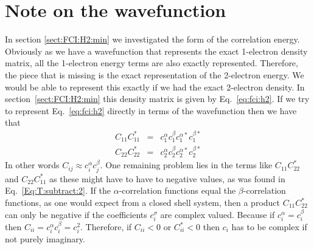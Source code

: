 \documentclass[pra,nofootinbib]{revtex4-1}
\begin{document}
\section{Note on the wavefunction}

In section \ref{sect:FCI:H2:min} we investigated the form of the correlation energy.
Obviously as we have a wavefunction that represents the exact 1-electron density
matrix, all the 1-electron energy terms are also exactly represented. Therefore, the
piece that is missing is the exact representation of the 2-electron energy. We would
be able to represent this exactly if we had the exact 2-electron density. In
section~\ref{sect:FCI:H2:min} this density matrix is given by Eq.~\ref{eq:fci:h2}.
If we try to represent Eq.~\ref{eq:fci:h2} directly in terms of the wavefunction then we
have that
\begin{eqnarray}
C_{11}C_{11}^* &=& c_1^\alpha c_1^\beta c_1^{\alpha*}c_1^{\beta*} \\
C_{22}C_{22}^* &=& c_2^\alpha c_2^\beta c_2^{\alpha*}c_2^{\beta*}
\end{eqnarray}
In other words $C_{ij} \approx c_i^\alpha c_j^\beta$. One remaining problem lies in the
terms like $C_{11}C_{22}^*$ and $C_{22}C_{11}^*$ as these might have to have to negative
values, as was found in Eq.~\ref{Eq:T:subtract:2}. If the $\alpha$-correlation functions
equal the $\beta$-correlation functions, as one would expect from a closed shell system,
then a product $C_{11}C_{22}^*$ can only be negative if the coefficients $c_i^\sigma$ are
complex valued. Because if $c_i^\alpha = c_i^\beta$ then $C_{ii} = c_i^\alpha c_i^\beta = c_i^2$.
Therefore, if $C_{ii} < 0$ or $C_{ii}^* < 0$ then $c_i$ has to be complex if not purely
imaginary.
\end{document}
